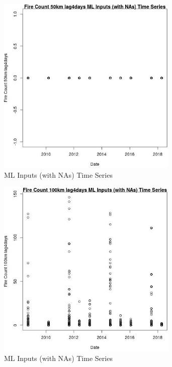 \begin{figure} 
\centering  
\includegraphics[width=0.77\textwidth]{Code_Outputs/Report_ML_input_PM25_Step4_part_e_de_duplicated_aves_compiled_2019-05-18wNAs_Fire_Count_50km_lag4daysvDate.jpg} 
\caption{\label{fig:Report_ML_input_PM25_Step4_part_e_de_duplicated_aves_compiled_2019-05-18wNAsFire_Count_50km_lag4daysvDate}ML Inputs (with NAs) Time Series} 
\end{figure} 
 

\begin{figure} 
\centering  
\includegraphics[width=0.77\textwidth]{Code_Outputs/Report_ML_input_PM25_Step4_part_e_de_duplicated_aves_compiled_2019-05-18wNAs_Fire_Count_100km_lag4daysvDate.jpg} 
\caption{\label{fig:Report_ML_input_PM25_Step4_part_e_de_duplicated_aves_compiled_2019-05-18wNAsFire_Count_100km_lag4daysvDate}ML Inputs (with NAs) Time Series} 
\end{figure} 
 

